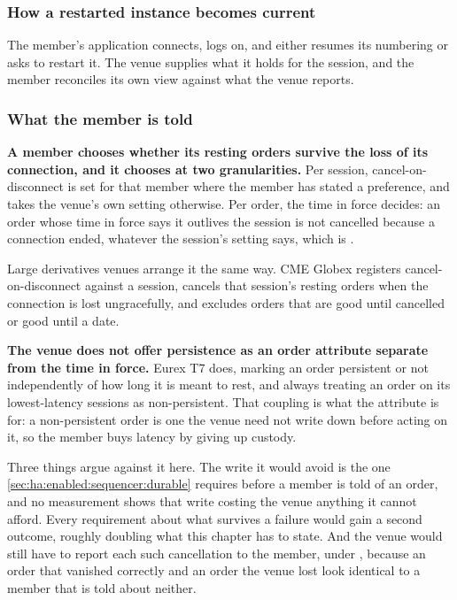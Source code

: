 \subsubsection{How a restarted instance becomes current}
\label{sec:ha:disabled:client:recovery}

The member's application connects, logs on, and either resumes its numbering or
asks to restart it. The venue supplies what it holds for the session, and the
member reconciles its own view against what the venue reports.

\subsubsection{What the member is told}
\label{sec:ha:disabled:client:member}

\textbf{A member chooses whether its resting orders survive the loss of its
connection, and it chooses at two granularities.} Per session, cancel-on-disconnect
is set for that member where the member has stated a preference, and takes the
venue's own setting otherwise. Per order, the time in force decides: an order
whose time in force says it outlives the session is not cancelled because a
connection ended, whatever the session's setting says, which is
.

Large derivatives venues arrange it the same way. CME Globex registers
cancel-on-disconnect against a session, cancels that session's resting orders
when the connection is lost ungracefully, and excludes orders that are good
until cancelled or good until a date.

\textbf{The venue does not offer persistence as an order attribute separate
from the time in force.} Eurex T7 does, marking an order persistent or not
independently of how long it is meant to rest, and always treating an order on
its lowest-latency sessions as non-persistent. That coupling is what the
attribute is for: a non-persistent order is one the venue need not write down
before acting on it, so the member buys latency by giving up custody.

Three things argue against it here. The write it would avoid is the one
\cref{sec:ha:enabled:sequencer:durable} requires before a member is told of an
order, and no measurement shows that write costing the venue anything it cannot
afford. Every requirement about what survives a failure would gain a second
outcome, roughly doubling what this chapter has to state. And the venue would
still have to report each such cancellation to the member, under
, because an order that vanished correctly and an order the
venue lost look identical to a member that is told about neither.

